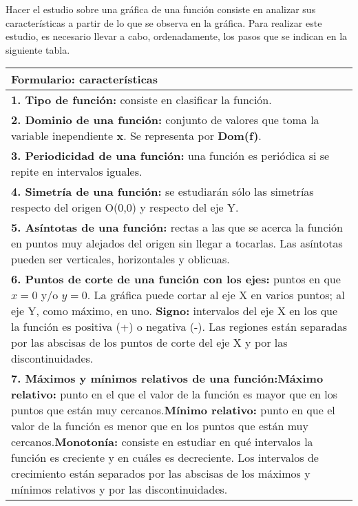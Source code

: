 Hacer el estudio sobre una gráfica de una función consiste en analizar sus características a partir de lo que se observa en la gráfica. Para realizar este estudio, es necesario llevar a cabo, ordenadamente, los pasos que se indican en la siguiente tabla.\\
\begin{table}[]
	
	\begin{tabular}{|p{5cm}|}
		\hline
	    \textbf{Formulario: características} \\ \hline
		\textbf{1. Tipo de función:} consiste en clasificar la función.\newline \\ \hline
		\textbf{2. Dominio de una función:} conjunto de valores que toma la variable inependiente \textbf{x}. Se representa por \textbf{Dom(f)}.\\ \hline
		\textbf{3. Periodicidad de una función:} una función es periódica si se repite en intervalos iguales.\\ \hline
		\textbf{4. Simetría de una función:} se estudiarán sólo las simetrías respecto del origen O(0,0) y respecto del eje Y.\\ \hline
		\textbf{5. Asíntotas de una función:} rectas a las que se acerca la función en puntos muy alejados del origen sin llegar a tocarlas. Las asíntotas pueden ser verticales, horizontales y oblicuas. \\ \hline
		\textbf{6. Puntos de corte de una función con los ejes:} puntos en que $x=0$ y/o $y=0$. La gráfica puede cortar al eje X en varios puntos; al eje Y, como máximo, en uno. \textbf{Signo:} intervalos del eje X en los que la función es positiva (+) o negativa (-). Las regiones están separadas por las abscisas de los puntos de corte del eje X y por las discontinuidades. \\ \hline
		\textbf{7. Máximos y mínimos relativos de una función:}\newline \textbf{Máximo relativo:} punto en el que el valor de la función es mayor que en los puntos que están muy cercanos.\newline \textbf{Mínimo relativo: } punto en que el valor de la función es menor que en los puntos que están muy cercanos.\newline \textbf{Monotonía: } consiste en estudiar en qué intervalos la función es creciente y en cuáles es decreciente. Los intervalos de crecimiento están separados por las abscisas de los máximos y mínimos relativos y por las discontinuidades. \\ \hline

\end{tabular}
\end{table}

